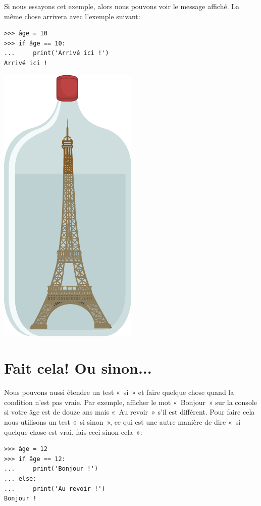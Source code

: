 Si nous essayons cet exemple, alors nous pouvons voir le message affiché. La même chose arrivera avec l'exemple suivant:

\begin{Verbatim}[frame=single,rulecolor=\color{green}, label=à taper avec attention]
>>> âge = 10
>>> if âge == 10:
...     print('Arrivé ici !')
Arrivé ici !
\end{Verbatim}

\begin{center}
\includegraphics[scale=1]{images/paris.pdf}
\end{center}

\section{Fait cela! Ou sinon...}

Nous pouvons aussi étendre un test « si » et faire quelque chose quand la condition n'est pas vraie. Par exemple, afficher le mot « Bonjour » sur la console si votre âge est de douze ans mais « Au revoir »  s'il est différent. Pour faire cela nous utilisons un test « si sinon », ce qui est une autre manière de dire « si quelque chose est vrai, fais ceci sinon cela »:

\begin{Verbatim}[frame=single,rulecolor=\color{green}, label=à taper avec attention]
>>> âge = 12
>>> if âge == 12:
...     print('Bonjour !')
... else:
...     print('Au revoir !')
Bonjour !
\end{Verbatim}

